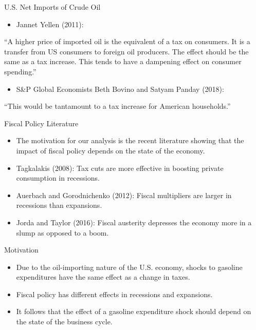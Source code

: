 \documentclass[
  10pt,
  ignorenonframetext,
]{beamer}
\providecommand{\tightlist}{%
  \setlength{\itemsep}{0pt}\setlength{\parskip}{0pt}}
\begin{document}
\begin{frame}{U.S. Net Imports of Crude Oil}
\protect\hypertarget{u.s.-net-imports-of-crude-oil}{}

\begin{itemize}
\tightlist
\item
  Jannet Yellen (2011):
\end{itemize}

``A higher price of imported oil is the equivalent of a tax on
consumers. It is a transfer from US consumers to foreign oil producers.
The effect should be the same as a tax increase. This tends to have a
dampening effect on consumer spending.''

\begin{itemize}
\tightlist
\item
  S\&P Global Economists Beth Bovino and Satyam Panday (2018):
\end{itemize}

``This would be tantamount to a tax increase for American households.''

\end{frame}

\begin{frame}{Fiscal Policy Literature}
\protect\hypertarget{fiscal-policy-literature}{}

\begin{itemize}
\item
  The motivation for our analysis is the recent literature showing that
  the impact of fiscal policy depends on the state of the economy.
\item
  Tagkalakis (2008): Tax cuts are more effective in boosting private
  consumption in recessions.
\item
  Auerbach and Gorodnichenko (2012): Fiscal multipliers are larger in
  recessions than expansions.
\item
  Jorda and Taylor (2016): Fiscal austerity depresses the economy more
  in a slump as opposed to a boom.
\end{itemize}

\end{frame}

\begin{frame}{Motivation}
\protect\hypertarget{motivation}{}

\begin{itemize}
\item
  Due to the oil-importing nature of the U.S. economy, shocks to
  gasoline expenditures have the same effect as a change in taxes.
\item
  Fiscal policy has different effects in recessions and expansions.
\item
  It follows that the effect of a gasoline expenditure shock should
  depend on the state of the business cycle.
\end{itemize}

\end{frame}
\end{document}
